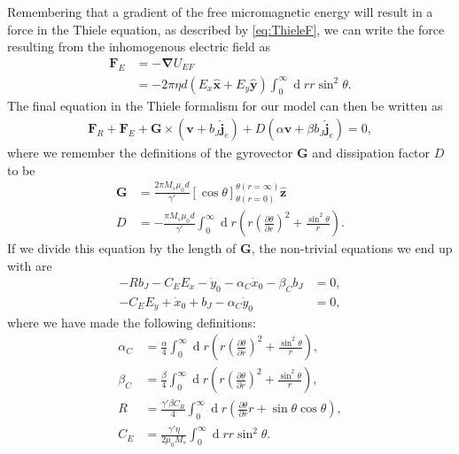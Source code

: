\documentclass[12pt, a4paper, twoside, openright]{report}
\renewcommand{\d}[1]{\ensuremath{\operatorname{d}\!{#1}}}
\numberwithin{equation}{chapter}
\numberwithin{figure}{chapter}
\numberwithin{table}{chapter}
\begin{document}
Remembering that a gradient of the free micromagnetic energy will result in a force in the Thiele equation, as described by \eqref{eq:ThieleF}, we can write the force resulting from the inhomogenous electric field as
\begin{align}
\nonumber\mathbold{F}_E &= -\mathbold{\nabla}U_{EF} \\
&= -2\pi \eta d \left(E_x \mathbold{\hat{x}} + E_y \mathbold{\hat{y}}\right) \int_0^{\infty}\d r r \sin^2\theta.
\end{align}
The final equation in the Thiele formalism for our model can then be written as
\begin{align}
\mathbold{F}_R+\mathbold{F}_E + \mathbold{G} \times\left(\mathbold{v}+b_J\mathbold{\hat{j}}_e\right) + D\left(\alpha\mathbold{v}+\beta b_J \mathbold{\hat{j}}_e\right) = 0,
\end{align}
where we remember the definitions of the gyrovector $\mathbold{G}$ and dissipation factor $D$ to be
\begin{subequations}
\begin{align}
\mathbold{G} &= \frac{2\pi M_s\mu_0 d}{\gamma'}\left[\cos\theta\right]_{\theta(r=0)}^{\theta(r=\infty)} \mathbold{\hat{z}}\\
D &= - \frac{\pi M_s \mu_0 d}{\gamma '} \int_0^{\infty} \d r \left(r\left(\frac{\partial \theta}{\partial r}\right)^2+\frac{\sin^2\theta}{r}\right).
\end{align}
\end{subequations}
If we divide this equation by the length of $\mathbold{G}$, the non-trivial equations we end up with are
\begin{subequations}
\label{eq:EquationsMotionElectricControl}
\begin{align}
- R b_J - C_E E_x - \dot{y}_0 - \alpha_C \dot{x}_0 - \beta_C b_J &= 0, \\
-C_E E_y + \dot{x}_0 + b_J -\alpha_C\dot{y}_0 &= 0,
\end{align}
\end{subequations}
where we have made the following definitions:
\begin{subequations}
\begin{align}
\alpha_C &= \frac{\alpha}{4} \int_0^{\infty} \d r \left(r\left(\frac{\partial \theta}{\partial r}\right)^2+\frac{\sin^2\theta}{r}\right), \\
\beta_C &=\frac{\beta}{4} \int_0^{\infty} \d r \left(r\left(\frac{\partial \theta}{\partial r}\right)^2+\frac{\sin^2\theta}{r}\right), \\
R &= \frac{\gamma'\beta C_R}{4} \int_0^{\infty} \d r \left(\frac{\partial \theta}{\partial r} r + \sin\theta\cos\theta \right), \\
C_E &= \frac{\gamma' \eta}{2\mu_0 M_s}\int_0^{\infty}\d r r\sin^2\theta.
\end{align}
\end{subequations}
\end{document}
